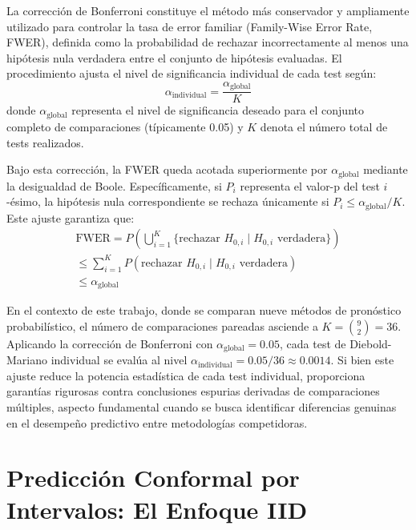 La corrección de Bonferroni \parencite{Bonferroni1936} constituye el método más conservador y ampliamente utilizado para controlar la tasa de error familiar (Family-Wise Error Rate, FWER), definida como la probabilidad de rechazar incorrectamente al menos una hipótesis nula verdadera entre el conjunto de hipótesis evaluadas. El procedimiento ajusta el nivel de significancia individual de cada test según:
\begin{equation}
\alpha_{\text{individual}} = \frac{\alpha_{\text{global}}}{K}
\label{eq:bonferroni}
\end{equation}
donde $\alpha_{\text{global}}$ representa el nivel de significancia deseado para el conjunto completo de comparaciones (típicamente 0.05) y $K$ denota el número total de tests realizados.

Bajo esta corrección, la FWER queda acotada superiormente por $\alpha_{\text{global}}$ mediante la desigualdad de Boole. Específicamente, si $P_i$ representa el valor-p del test $i$-ésimo, la hipótesis nula correspondiente se rechaza únicamente si $P_i \leq \alpha_{\text{global}}/K$. Este ajuste garantiza que:
\begin{multline}
\text{FWER} = P\left(\bigcup_{i=1}^K \{\text{rechazar } H_{0,i} \mid H_{0,i} \text{ verdadera}\}\right) \\
\leq \sum_{i=1}^K P(\text{rechazar } H_{0,i} \mid H_{0,i} \text{ verdadera}) \\
\leq \alpha_{\text{global}}
\end{multline}

En el contexto de este trabajo, donde se comparan nueve métodos de pronóstico probabilístico, el número de comparaciones pareadas asciende a $K = \binom{9}{2} = 36$. Aplicando la corrección de Bonferroni con $\alpha_{\text{global}} = 0.05$, cada test de Diebold-Mariano individual se evalúa al nivel $\alpha_{\text{individual}} = 0.05/36 \approx 0.0014$. Si bien este ajuste reduce la potencia estadística de cada test individual, proporciona garantías rigurosas contra conclusiones espurias derivadas de comparaciones múltiples, aspecto fundamental cuando se busca identificar diferencias genuinas en el desempeño predictivo entre metodologías competidoras.

\section{Predicción Conformal por Intervalos: El Enfoque IID}
\label{sec:prediccion_conformal_intervalos_IIE}


